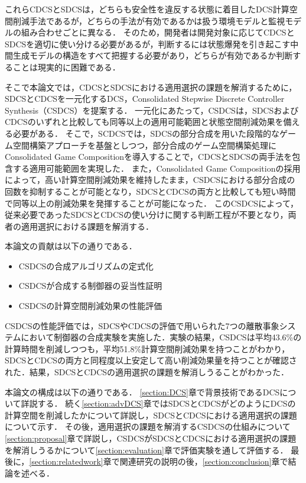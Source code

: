 これらCDCSとSDCSは，どちらも安全性を違反する状態に着目したDCS計算空間削減手法であるが，どちらの手法が有効であるかは扱う環境モデルと監視モデルの組み合わせごとに異なる．
そのため，開発者は開発対象に応じてCDCSとSDCSを適切に使い分ける必要があるが，判断するには状態爆発を引き起こす中間生成モデルの構造をすべて把握する必要があり，どちらが有効であるか判断することは現実的に困難である．

そこで本論文では，CDCSとSDCSにおける適用選択の課題を解消するために，SDCSとCDCSを一元化するDCS，Consolidated Stepwise Discrete Controller Synthesis（CSDCS）を提案する．
一元化にあたって，CSDCSは，SDCSおよびCDCSのいずれと比較しても同等以上の適用可能範囲と状態空間削減効果を備える必要がある．
そこで，SCDCSでは，SDCSの部分合成を用いた段階的なゲーム空間構築アプローチを基盤としつつ，部分合成のゲーム空間構築処理にConsolidated Game Compositionを導入することで，CDCSとSDCSの両手法を包含する適用可能範囲を実現した．
また，Consolidated Game Compositionの採用によって，高い計算空間削減効果を維持したまま，CSDCSにおける部分合成の回数を抑制することが可能となり，SDCSとCDCSの両方と比較しても短い時間で同等以上の削減効果を発揮することが可能になった．
このCSDCSによって，従来必要であったSDCSとCDCSの使い分けに関する判断工程が不要となり，両者の適用選択における課題を解消する．

本論文の貢献は以下の通りである．
\begin{itemize}
	\item CSDCSの合成アルゴリズムの定式化
	\item CSDCSが合成する制御器の妥当性証明
	\item CSDCSの計算空間削減効果の性能評価
\end{itemize}
CSDCSの性能評価では，SDCSやCDCSの評価で用いられた7つの離散事象システムにおいて制御器の合成実験を実施した．実験の結果，CSDCSは平均43.6\%の計算時間を削減しつつも，平均51.8\%計算空間削減効果を持つことがわかり，SDCSとCDCSの両方と同程度以上安定して高い削減効果量を持つことが確認された．結果，SDCSとCDCSの適用選択の課題を解消しうることがわかった．

本論文の構成は以下の通りである．
\ref{section:DCS}章で背景技術であるDCSについて詳説する．
続く\ref{section:advDCS}章ではSDCSとCDCSがどのようにDCSの計算空間を削減したかについて詳説し，SDCSとCDCSにおける適用選択の課題について示す．
その後，適用選択の課題を解消するCSDCSの仕組みについて\ref{section:proposal}章で詳説し，CSDCSがSDCSとCDCSにおける適用選択の課題を解消しうるかについて\ref{section:evaluation}章で評価実験を通して評価する．
最後に，\ref{section:relatedwork}章で関連研究の説明の後，\ref{section:conclusion}章で結論を述べる．